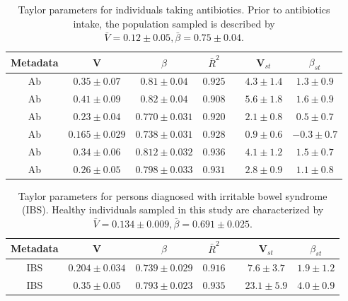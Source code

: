 \documentclass[12pt,oneside,letterpaper]{article}
\begin{document}
 \begin{table} 
  \begin{center}
    \begin{tabular}{ccccccc}
	    \hline
		Metadata&V&$\beta$&$\bar{R}^2$&&V$_{st}$&$\beta_{st}$\\
		\hline
		Ab&$0.35 \pm 0.07$&$0.81 \pm 0.04$&$0.925$&&$4.3 \pm 1.4$&$1.3 \pm 0.9$\\
		Ab&$0.41 \pm 0.09$&$0.82 \pm 0.04$&$0.908$&&$5.6 \pm 1.8$&$1.6 \pm 0.9$\\
		Ab&$0.23 \pm 0.04$&$0.770 \pm 0.031$&$0.920$&&$2.1 \pm 0.8$&$0.5 \pm 0.7$\\
		Ab&$0.165 \pm 0.029$&$0.738 \pm 0.031$&$0.928$&&$0.9 \pm 0.6$&$-0.3 \pm 0.7$\\
		Ab&$0.34 \pm 0.06$&$0.812 \pm 0.032$&$0.936$&&$4.1 \pm 1.2$&$1.5 \pm 0.7$\\
		Ab&$0.26 \pm 0.05$&$0.798 \pm 0.033$&$0.931$&&$2.8 \pm 0.9$&$1.1 \pm 0.8$\\
	    \hline
	    \hline
    \end{tabular}
  \end{center}
  \caption{Taylor parameters for individuals taking antibiotics\cite{antibiotic}. Prior to antibiotics intake, the population sampled is described by $\bar{V} = 0.12 \pm 0.05, \bar{\beta} = 0.75 \pm 0.04$.}
  \label{tab:antibiotics}
\end{table}

\begin{table} 
  \begin{center}
    \begin{tabular}{ccccccc}
	    \hline
		Metadata&V&$\beta$&$\bar{R}^2$&&V$_{st}$&$\beta_{st}$\\
		\hline
		IBS&$0.204 \pm 0.034$&$0.739 \pm 0.029$&$0.916$&&$7.6 \pm 3.7$&$1.9 \pm 1.2$\\
		IBS&$0.35 \pm 0.05$&$0.793 \pm 0.023$&$0.935$&&$23.1 \pm 5.9$&$4.0 \pm 0.9$\\
	     \hline
	     \hline
    \end{tabular}
  \end{center}
  \caption{Taylor parameters for persons diagnosed with irritable bowel syndrome (IBS)\cite{IBS}. Healthy individuals sampled in this study are characterized by $\bar{V} = 0.134 \pm 0.009, \bar{\beta} = 0.691 \pm 0.025$.}
  \label{tab:IBS}
\end{table}
\end{document}
